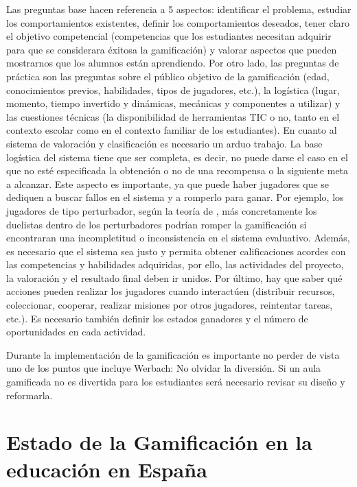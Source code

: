 \label{PasosGamificar}
%
Las preguntas base hacen referencia a 5 aspectos: identificar el problema, estudiar los comportamientos existentes, definir los comportamientos deseados, tener claro el objetivo competencial (competencias que los estudiantes necesitan adquirir para que se considerara éxitosa la gamificación) y valorar aspectos que pueden mostrarnos que los alumnos están aprendiendo.
%
Por otro lado, las preguntas de práctica son las preguntas sobre el público objetivo de la gamificación (edad, conocimientos previos, habilidades, tipos de jugadores, etc.), la logística (lugar, momento, tiempo invertido y dinámicas, mecánicas y componentes a utilizar) y las cuestiones técnicas (la disponibilidad de herramientas TIC o no, tanto en el contexto escolar como en el contexto familiar de los estudiantes).
%
En cuanto al sistema de valoración y clasificación es necesario un arduo trabajo.
%
La base logística del sistema tiene que ser completa, es decir, no puede darse el caso en el que no esté especificada la obtención o no de una recompensa o la siguiente meta a alcanzar.
%
Este aspecto es importante, ya que puede haber jugadores que se dediquen a buscar fallos en el sistema y a romperlo para ganar.
%
Por ejemplo, los jugadores de tipo perturbador, según la teoría de  \citet{marczewski}, más concretamente los duelistas dentro de los perturbadores podrían romper la gamificación si encontraran una incompletitud o inconsistencia en el sistema evaluativo.
%
Además, es necesario que el sistema sea justo y permita obtener calificaciones acordes con las competencias y habilidades adquiridas, por ello, las actividades del proyecto, la valoración y el resultado final deben ir unidos.
%
Por último, hay que saber qué acciones pueden realizar los jugadores cuando interactúen (distribuir recursos, coleccionar, cooperar, realizar misiones por otros jugadores, reintentar tareas, etc.). 
%
Es necesario también definir los estados ganadores y el número de oportunidades en cada actividad.

Durante la implementación de la gamificación es importante no perder de vista uno de los puntos que incluye Werbach: No olvidar la diversión.
%
Si un aula gamificada no es divertida para los estudiantes será necesario revisar su diseño y reformarla.


\section{Estado de la Gamificación en la educación en España}

